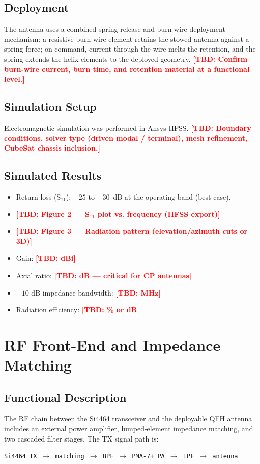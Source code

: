 \documentclass[conference]{IEEEtran}
\newcommand{\tbd}[1]{\textcolor{red}{\textbf{[TBD: #1]}}}
\begin{document}
\subsection{Deployment}
The antenna uses a combined spring-release and burn-wire deployment mechanism: a resistive burn-wire element retains the stowed antenna against a spring force; on command, current through the wire melts the retention, and the spring extends the helix elements to the deployed geometry. \tbd{Confirm burn-wire current, burn time, and retention material at a functional level.}

\subsection{Simulation Setup}
Electromagnetic simulation was performed in Ansys HFSS. \tbd{Boundary conditions, solver type (driven modal / terminal), mesh refinement, CubeSat chassis inclusion.}

\subsection{Simulated Results}
\begin{itemize}
\item Return loss (S$_{11}$): $-25$ to $-30$~dB at the operating band (best case).
\item \tbd{Figure 2 --- S$_{11}$ plot vs. frequency (HFSS export)}
\item \tbd{Figure 3 --- Radiation pattern (elevation/azimuth cuts or 3D)}
\item Gain: \tbd{dBi}
\item Axial ratio: \tbd{dB --- critical for CP antennas}
\item $-10$ dB impedance bandwidth: \tbd{MHz}
\item Radiation efficiency: \tbd{\% or dB}
\end{itemize}

\section{RF Front-End and Impedance Matching}

\subsection{Functional Description}
The RF chain between the Si4464 transceiver and the deployable QFH antenna includes an external power amplifier, lumped-element impedance matching, and two cascaded filter stages. The TX signal path is:
\begin{center}
\texttt{Si4464 TX $\to$ matching $\to$ BPF $\to$ PMA-7+ PA $\to$ LPF $\to$ antenna}
\end{center}
\end{document}
